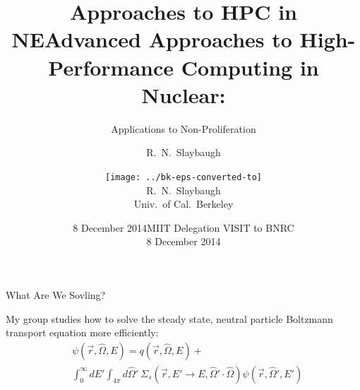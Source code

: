 \documentclass[xcolor=x11names,compress]{beamer}
\title{Approaches to HPC in NE}
\author{R.\ N.\ Slaybaugh}
\date{8 December 2014}
\renewcommand{\(}{\begin{columns}}
\renewcommand{\)}{\end{columns}}
\newcommand{\<}[1]{\begin{column}{#1}}
\renewcommand{\>}{\end{column}}
\newcommand{\Macro}{\ensuremath{\Sigma}}
\newcommand{\vOmega}{\ensuremath{\hat{\Omega}}}
\begin{document}
\begin{frame}
\title{Advanced Approaches to High-Performance Computing in Nuclear:}
\subtitle{Applications to Non-Proliferation}
\author{\texttt{[image: ../bk-eps-converted-to]}\\R.\ N.\ Slaybaugh \\ Univ.\ of Cal.\ Berkeley}

\date{MIIT Delegation VISIT to BNRC \\ 8 December 2014}
\titlepage
\end{frame}

\begin{frame}{What Are We Sovling?}

    My group studies how to solve the steady state, neutral particle Boltzmann
    transport equation more efficiently:
    \begin{align}
    [\vOmega \cdot \nabla + \Macro(\vec{r}, E)] &\psi(\vec{r}, \vOmega, E)  =  q(\vec{r}, \vOmega, E) + \nonumber\\
     &\int_0^{\infty} dE' \int_{4\pi} d\vOmega' \:\Macro_{s}(\vec{r}, E' \to E,
     \vOmega' \cdot \vOmega) \psi(\vec{r}, \vOmega', E') \nonumber
    \end{align}
    

\end{frame}
\end{document}
